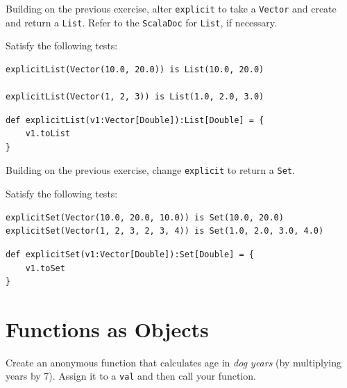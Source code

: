 \documentclass[a4paper,12pt]{exam}
\begin{document}
\begin{questions}
\question
Building on the previous exercise, alter \texttt{explicit} to take a 
\texttt{Vector} and create and return a \texttt{List}. 
Refer to the \texttt{ScalaDoc} for \texttt{List}, if necessary. 

Satisfy the following tests: 
\begin{Verbatim}
explicitList(Vector(10.0, 20.0)) is List(10.0, 20.0)

explicitList(Vector(1, 2, 3)) is List(1.0, 2.0, 3.0)
\end{Verbatim}
\begin{solution}
\begin{Verbatim}
def explicitList(v1:Vector[Double]):List[Double] = {
    v1.toList
}	
\end{Verbatim}	
\end{solution}

\question
Building on the previous exercise, change \texttt{explicit} to return a \texttt{Set}. 

Satisfy the following tests:
\begin{Verbatim}
explicitSet(Vector(10.0, 20.0, 10.0)) is Set(10.0, 20.0)
explicitSet(Vector(1, 2, 3, 2, 3, 4)) is Set(1.0, 2.0, 3.0, 4.0)
\end{Verbatim}
\begin{solution}
\begin{Verbatim}
def explicitSet(v1:Vector[Double]):Set[Double] = {
    v1.toSet
}	
\end{Verbatim}	
\end{solution}

\section*{Functions as Objects}

%

\question
Create an anonymous function that calculates age in \emph{dog years} 
(by multiplying years by 7). 
Assign it to a \verb!val! and then call your function. 


\end{questions}
\end{document}
